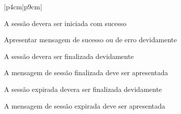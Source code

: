\begin{tabela}{|p{4cm}|p{9cm}|}
    \begin{enumalfa}
        \item A sessão devera ser iniciada com sucesso
        \item Apresentar mensagem de sucesso ou de erro devidamente
        \item A sessão devera ser finalizada devidamente
        \item A mensagem de sessão finalizada deve ser apresentada
        \item A sessão expirada devera ser finalizada devidamente
        \item A mensagem de sessão expirada deve ser apresentada
    \end{enumalfa}\\
    \hline
\end{tabela}

